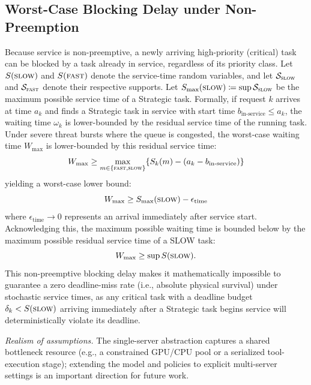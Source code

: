 \documentclass[preprint,12pt]{elsarticle}
\begin{document}
\subsection{Worst-Case Blocking Delay under Non-Preemption}
\label{sec:worst_case_blocking}
Because service is non-preemptive, a newly arriving high-priority (critical) task can be blocked by a task already in service, regardless of its priority class. Let $S(\textsc{slow})$ and $S(\textsc{fast})$ denote the service-time random variables, and let $\mathcal{S}_{\textsc{slow}}$ and $\mathcal{S}_{\textsc{fast}}$ denote their respective supports. Let $S_{\max}(\textsc{slow}) \coloneqq \sup \mathcal{S}_{\textsc{slow}}$ be the maximum possible service time of a Strategic task. Formally, if request $k$ arrives at time $a_k$ and finds a Strategic task in service with start time $b_{\text{in-service}} \le a_k$, the waiting time $\omega_k$ is lower-bounded by the residual service time of the running task. Under severe threat bursts where the queue is congested, the worst-case waiting time $W_{\max}$ is lower-bounded by this residual service time:
\begin{equation}
W_{\max} \ge \max_{m \in \{\textsc{fast}, \textsc{slow}\}} \{S_k(m) - (a_k - b_{\text{in-service}})\}
\end{equation}
yielding a worst-case lower bound:
\begin{equation}
W_{\max} \ge S_{\max}(\textsc{slow}) - \epsilon_{\text{time}}
\end{equation}
where $\epsilon_{\text{time}} \to 0$ represents an arrival immediately after service start. Acknowledging this, the maximum possible waiting time is bounded below by the maximum possible residual service time of a SLOW task:
\begin{equation}
W_{\max} \ge \sup S(\textsc{slow}).
\end{equation}
This non-preemptive blocking delay makes it mathematically impossible to guarantee a zero deadline-miss rate (i.e., absolute physical survival) under stochastic service times, as any critical task with a deadline budget $\delta_k < S(\textsc{slow})$ arriving immediately after a Strategic task begins service will deterministically violate its deadline.

\emph{Realism of assumptions.} The single-server abstraction captures a shared bottleneck resource (e.g., a constrained GPU/CPU pool or a serialized tool-execution stage); extending the model and policies to explicit multi-server settings is an important direction for future work.
\end{document}
